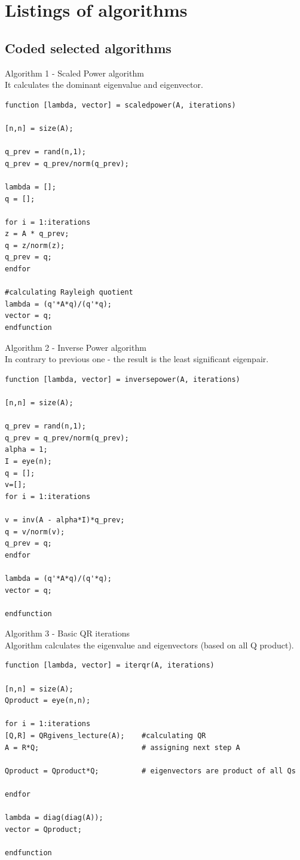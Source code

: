 \documentclass[eng,openany]{mgr}
\begin{document}
\chapter{Listings of algorithms}
\section{Coded selected algorithms}
Algorithm 1 - Scaled Power algorithm\\
It calculates the dominant eigenvalue and eigenvector. 
\begin{lstlisting}
function [lambda, vector] = scaledpower(A, iterations)

[n,n] = size(A);

q_prev = rand(n,1);
q_prev = q_prev/norm(q_prev);

lambda = [];
q = [];

for i = 1:iterations
z = A * q_prev;
q = z/norm(z);
q_prev = q;
endfor

#calculating Rayleigh quotient
lambda = (q'*A*q)/(q'*q);
vector = q;
endfunction
\end{lstlisting}
\newpage
Algorithm 2 - Inverse Power algorithm\\
In contrary to previous one - the result is the least significant eigenpair.
\begin{lstlisting}
function [lambda, vector] = inversepower(A, iterations)

[n,n] = size(A);

q_prev = rand(n,1);
q_prev = q_prev/norm(q_prev);
alpha = 1;
I = eye(n);
q = [];
v=[];
for i = 1:iterations

v = inv(A - alpha*I)*q_prev;
q = v/norm(v);
q_prev = q;
endfor

lambda = (q'*A*q)/(q'*q);
vector = q;

endfunction

\end{lstlisting}
Algorithm 3 - Basic QR iterations\\
Algorithm calculates the eigenvalue and eigenvectors (based on all Q product).
\begin{lstlisting}
function [lambda, vector] = iterqr(A, iterations)

[n,n] = size(A);
Qproduct = eye(n,n);

for i = 1:iterations
[Q,R] = QRgivens_lecture(A);    #calculating QR
A = R*Q;                		# assigning next step A

Qproduct = Qproduct*Q;    		# eigenvectors are product of all Qs

endfor

lambda = diag(diag(A));
vector = Qproduct;

endfunction
\end{lstlisting}
\newpage
\end{document}
